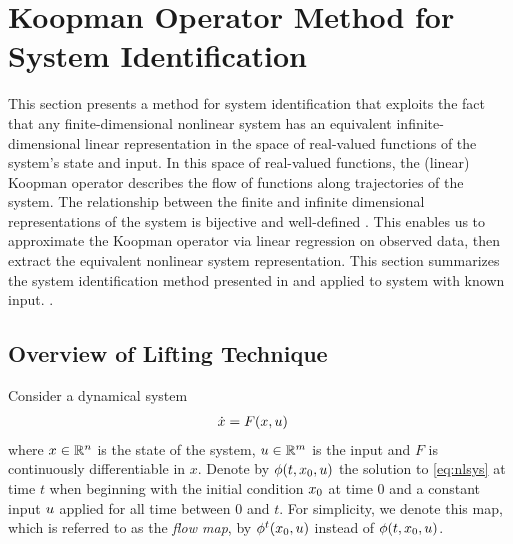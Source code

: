 \section{Koopman Operator Method for \\ System Identification}
\label{sec:theory}

This section  presents  a method for system identification that exploits the fact that any finite-dimensional nonlinear system has an equivalent infinite-dimensional linear representation in the space of real-valued functions of the system's state and input.
In this space of real-valued functions, the (linear) Koopman operator describes the flow of functions along trajectories of the system.
The relationship between the finite and infinite dimensional representations of the system is bijective and well-defined \cite[]{lasota2013chaos}.
This enables us to approximate the Koopman operator via linear regression on observed data, then extract the equivalent nonlinear system representation.
This section summarizes the system identification method presented in \cite{mauroy2016linear} and \cite{mauroy2017koopman} applied to system with known input.  .


\subsection{Overview of Lifting Technique}


Consider a dynamical system
\begin{align}
    \dot{x} &= F(x,u)    \label{eq:nlsys}
\end{align}
where $x \in \mathbb{R}^n$ is the state of the system, $u \in \mathbb{R}^m$ is the input and ${F}$ is continuously differentiable in $x$.
Denote by $\phi(t,x_0,u)$ the solution to \eqref{eq:nlsys} at time $t$ when beginning with the initial condition $x_0$ at time $0$ and a constant input $u$ applied for all time between $0$ and $t$.
For simplicity, we denote this map, which is referred to as the \emph{flow map}, by $\phi^t (x_0, u)$ instead of $\phi (t, x_0, u)$.

